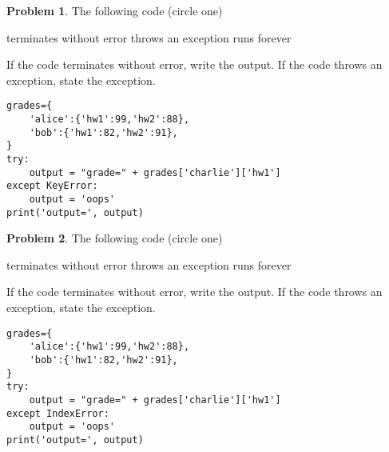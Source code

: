 \documentclass[10pt]{article}
\theoremstyle{definition}
\newtheorem{problem}{Problem}
\begin{document}
\begin{problem}
    The following code (circle one)

    \vspace{0.25in}
    \hspace{0.5in}terminates without error 
    \hspace{1in}throws an exception
    \hspace{1in}runs forever
    \vspace{0.25in}

    \noindent
    If the code terminates without error, write the output.
    If the code throws an exception, state the exception.
\end{problem}
\begin{lstlisting}
grades={
    'alice':{'hw1':99,'hw2':88},
    'bob':{'hw1':82,'hw2':91},
}
try:
    output = "grade=" + grades['charlie']['hw1']
except KeyError:
    output = 'oops'
print('output=', output)
\end{lstlisting}
\vspace{0.75in}


\begin{problem}
    The following code (circle one)

    \vspace{0.25in}
    \hspace{0.5in}terminates without error 
    \hspace{1in}throws an exception
    \hspace{1in}runs forever
    \vspace{0.25in}

    \noindent
    If the code terminates without error, write the output.
    If the code throws an exception, state the exception.
\end{problem}
\begin{lstlisting}
grades={
    'alice':{'hw1':99,'hw2':88},
    'bob':{'hw1':82,'hw2':91},
}
try:
    output = "grade=" + grades['charlie']['hw1']
except IndexError:
    output = 'oops'
print('output=', output)
\end{lstlisting}
\vspace{0.75in}
\end{document}
